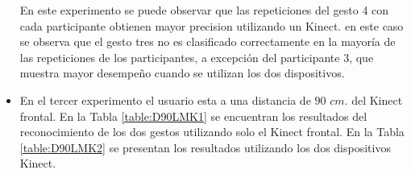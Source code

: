 \begin{itemize}
En este experimento se puede observar que las repeticiones del gesto 4 con cada participante obtienen mayor precision utilizando un Kinect. en este caso se observa que el gesto tres no es clasificado correctamente en la mayoría de las repeticiones de los participantes, a excepción del participante 3, que muestra mayor desempeño cuando se utilizan los dos dispositivos.


\item En el tercer experimento el usuario esta a una distancia de $90$ $cm.$ del Kinect frontal. En la Tabla \ref{table:D90LMK1} se encuentran los resultados del reconocimiento de los dos gestos utilizando solo el Kinect frontal. En la Tabla \ref{table:D90LMK2} se presentan los resultados utilizando los dos dispositivos Kinect.     

%


\end{itemize}
